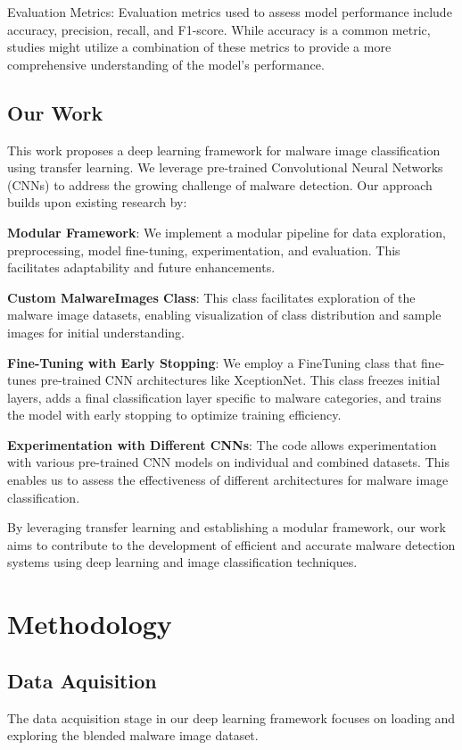 \documentclass[conference]{IEEEtran}
\begin{document}
    Evaluation Metrics:  Evaluation metrics used to assess model performance include accuracy, precision, recall, and F1-score. While accuracy is a common metric, studies might utilize a combination of these metrics to provide a more comprehensive understanding of the model's performance.

\subsection{Our Work}
This work proposes a deep learning framework for malware image classification using transfer learning. We leverage pre-trained Convolutional Neural Networks (CNNs) to address the growing challenge of malware detection. Our approach builds upon existing research by:

    \textbf{Modular Framework}: We implement a modular pipeline for data exploration, preprocessing, model fine-tuning, experimentation, and evaluation. This facilitates adaptability and future enhancements.
    
    \textbf{Custom MalwareImages Class}: This class facilitates exploration of the malware image datasets, enabling visualization of class distribution and sample images for initial understanding.
    
    \textbf{Fine-Tuning with Early Stopping}: We employ a FineTuning class that fine-tunes pre-trained CNN architectures like XceptionNet. This class freezes initial layers, adds a final classification layer specific to malware categories, and trains the model with early stopping to optimize training efficiency.
    
    \textbf{Experimentation with Different CNNs}: The code allows experimentation with various pre-trained CNN models on individual and combined datasets. This enables us to assess the effectiveness of different architectures for malware image classification.

By leveraging transfer learning and establishing a modular framework, our work aims to contribute to the development of efficient and accurate malware detection systems using deep learning and image classification techniques.

\section{Methodology}
\subsection{Data Aquisition}
The data acquisition stage in our deep learning framework focuses on loading and exploring the blended malware image dataset.
\end{document}
